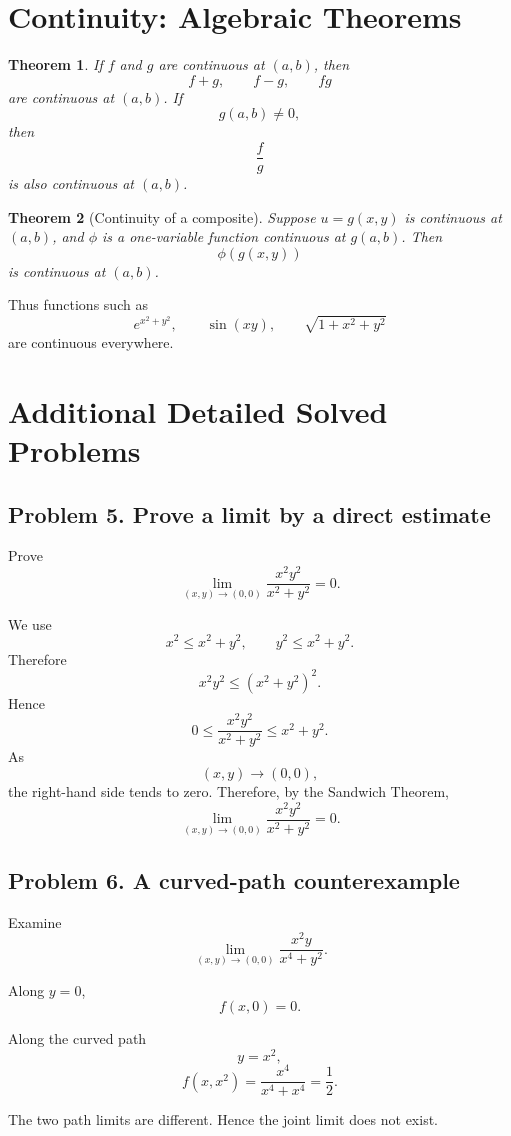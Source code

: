 \documentclass[11pt,oneside]{book}
\theoremstyle{studentthm}
\newtheorem{theorem}{Theorem}[chapter]
\theoremstyle{definition}
\begin{document}
\section{Continuity: Algebraic Theorems}

\begin{theorem}
If \(f\) and \(g\) are continuous at \((a,b)\), then
\[
f+g,\qquad f-g,\qquad fg
\]
are continuous at \((a,b)\). If
\[
g(a,b)\ne0,
\]
then
\[
\frac{f}{g}
\]
is also continuous at \((a,b)\).
\end{theorem}

\begin{theorem}[Continuity of a composite]
Suppose \(u=g(x,y)\) is continuous at \((a,b)\), and \(\phi\) is a
one-variable function continuous at \(g(a,b)\). Then
\[
\phi(g(x,y))
\]
is continuous at \((a,b)\).
\end{theorem}

Thus functions such as
\[
e^{x^2+y^2},
\qquad
\sin(xy),
\qquad
\sqrt{1+x^2+y^2}
\]
are continuous everywhere.

\section{Additional Detailed Solved Problems}

\subsection*{Problem 5. Prove a limit by a direct estimate}

Prove
\[
\lim_{(x,y)\to(0,0)}
\frac{x^2y^2}{x^2+y^2}
=0.
\]

We use
\[
x^2\le x^2+y^2,
\qquad
y^2\le x^2+y^2.
\]
Therefore
\[
x^2y^2
\le
(x^2+y^2)^2.
\]
Hence
\[
0\le
\frac{x^2y^2}{x^2+y^2}
\le
x^2+y^2.
\]
As
\[
(x,y)\to(0,0),
\]
the right-hand side tends to zero. Therefore, by the Sandwich Theorem,
\[
\lim_{(x,y)\to(0,0)}
\frac{x^2y^2}{x^2+y^2}
=0.
\]

\subsection*{Problem 6. A curved-path counterexample}

Examine
\[
\lim_{(x,y)\to(0,0)}
\frac{x^2y}{x^4+y^2}.
\]

Along \(y=0\),
\[
f(x,0)=0.
\]

Along the curved path
\[
y=x^2,
\]
\[
f(x,x^2)
=
\frac{x^4}{x^4+x^4}
=
\frac12.
\]

The two path limits are different. Hence the joint limit does not
exist.
\end{document}
